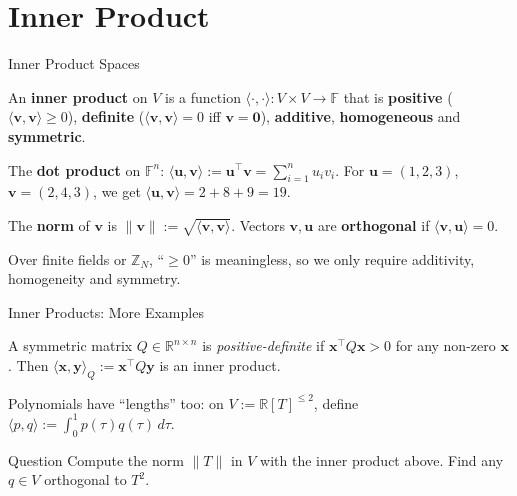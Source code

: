 \documentclass{zkdl-presentation-template}
\begin{document}
    \section{Inner Product}

    \begin{frame}{Inner Product Spaces}
        \begin{definition}
            An \textbf{inner product} on $V$ is a function $\langle \cdot, \cdot \rangle: V \times V \to \mathbb{F}$ that is \textbf{positive} ($\langle \mathbf{v}, \mathbf{v} \rangle \geq 0$), \textbf{definite} ($\langle \mathbf{v}, \mathbf{v} \rangle = 0$ iff $\mathbf{v}=\mathbf{0}$), \textbf{additive}, \textbf{homogeneous} and \textbf{symmetric}.
        \end{definition}
        \pause

        \begin{example}
            The \textbf{dot product} on $\mathbb{F}^n$: $\langle \mathbf{u}, \mathbf{v} \rangle := \mathbf{u}^{\top}\mathbf{v} = \sum_{i=1}^{n} u_i v_i$. For $\mathbf{u}=(1, 2, 3)$, $\mathbf{v} = (2, 4, 3)$, we get $\langle \mathbf{u}, \mathbf{v}\rangle = 2 + 8 + 9 = 19$.
        \end{example}
        \pause

        \begin{definition}
            The \textbf{norm} of $\mathbf{v}$ is $\|\mathbf{v}\| := \sqrt{\langle \mathbf{v}, \mathbf{v} \rangle}$. Vectors $\mathbf{v},\mathbf{u}$ are \textbf{orthogonal} if $\langle \mathbf{v}, \mathbf{u} \rangle = 0$.
        \end{definition}

        \begin{remark}
            Over finite fields or $\mathbb{Z}_N$, ``$\geq 0$'' is meaningless, so we only require additivity, homogeneity and symmetry.
        \end{remark}
    \end{frame}

    \begin{frame}{Inner Products: More Examples}
        \begin{example}
            A symmetric matrix $Q \in \mathbb{R}^{n \times n}$ is \textit{positive-definite} if $\mathbf{x}^{\top}Q\mathbf{x} > 0$ for any non-zero $\mathbf{x}$. Then $\langle \mathbf{x}, \mathbf{y} \rangle_Q := \mathbf{x}^{\top}Q\mathbf{y}$ is an inner product.
        \end{example}
        \pause

        \begin{example}
            Polynomials have ``lengths'' too: on $V := \mathbb{R}[T]^{\leq 2}$, define $\langle p,q \rangle := \int_0^1 p(\tau)q(\tau)\,d\tau$.
        \end{example}
        \pause

        \begin{questionblock}{Question}
            Compute the norm $\|T\|$ in $V$ with the inner product above. Find any $q \in V$ orthogonal to $T^2$.
        \end{questionblock}
    \end{frame}
\end{document}
